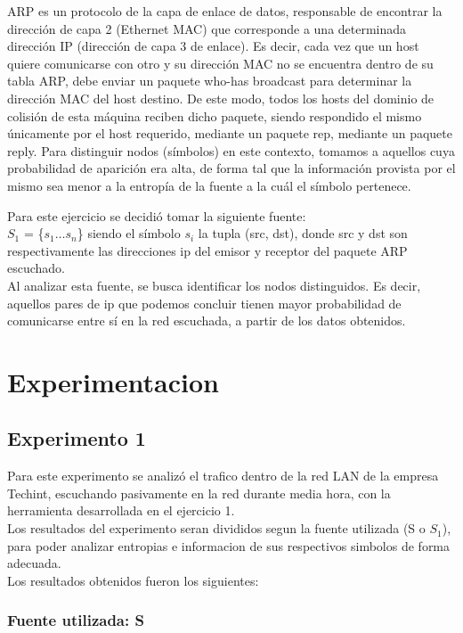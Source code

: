\documentclass[final,narroweqnarray,inline]{ieee}
\begin{document}
ARP es un protocolo de la capa de enlace de datos, responsable de encontrar
la dirección de capa 2 (Ethernet MAC) que corresponde a una determinada
dirección IP (dirección de capa 3 de enlace). Es decir, cada vez que un host
quiere comunicarse con otro y su dirección MAC no se encuentra dentro de su
tabla ARP, debe enviar un paquete who-has broadcast para determinar la dirección MAC
del host destino. De este modo, todos los hosts del dominio de colisión de
esta máquina reciben dicho paquete, siendo respondido el mismo únicamente
por el host requerido, mediante un paquete rep, mediante un paquete reply.
Para distinguir nodos (símbolos) en este contexto, tomamos a aquellos cuya
probabilidad de aparición era alta, de forma tal que la información provista
por el mismo sea menor a la entropía de la fuente a la cuál el símbolo
pertenece.

\medskip
Para este ejercicio se decidi\'o tomar la siguiente fuente: \\ 
$S_{1}$ = \{$s_{1} \dots s_{n}$\} siendo el símbolo $s_{i}$ la tupla (src, dst), donde
src y dst son respectivamente las direcciones ip del emisor y receptor del
paquete ARP escuchado.  \\
Al analizar esta fuente, se busca identificar los nodos distinguidos. Es
decir, aquellos pares de ip que podemos concluir tienen mayor probabilidad de comunicarse
entre sí en la red escuchada, a partir de los datos obtenidos. 


\section{Experimentacion}


\subsection{Experimento 1}
Para este experimento se analiz\'o el trafico dentro de la red LAN de la empresa Techint, escuchando pasivamente
en la red durante media hora, con la herramienta desarrollada en el ejercicio 1. \\
Los resultados del experimento seran divididos segun la fuente utilizada (S o $S_{1}$), para poder analizar
entropias e informacion de sus respectivos simbolos de forma adecuada. \\
Los resultados obtenidos fueron los siguientes: 

\subsubsection{Fuente utilizada: S}
\end{document}
